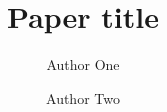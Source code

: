 \documentclass[11pt]{article}
\title{Paper title}
\author{Author One \and Author Two}
\date{}
\begin{document}
\maketitle

\begin{abstract}

\end{abstract}








% 
% 

\appendix

\end{document}
